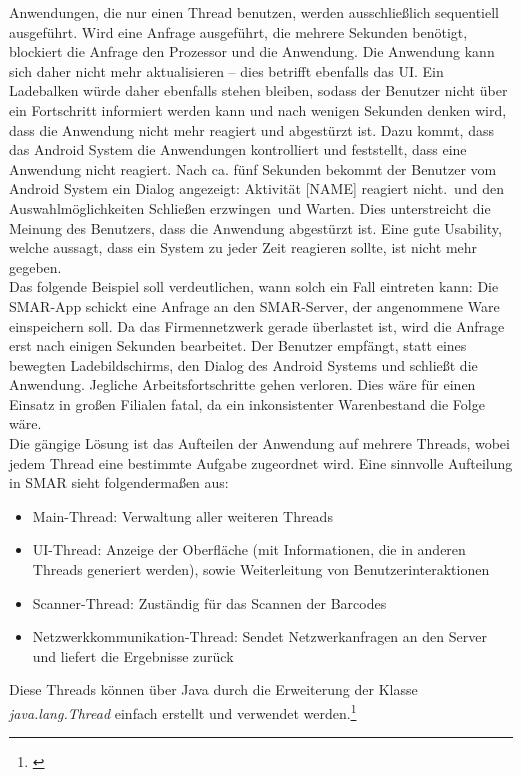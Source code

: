 Anwendungen, die nur einen Thread benutzen, werden ausschließlich sequentiell ausgeführt. Wird eine Anfrage ausgeführt, die mehrere Sekunden benötigt, blockiert die Anfrage den Prozessor und die Anwendung. Die Anwendung kann sich daher nicht mehr aktualisieren -- dies betrifft ebenfalls das \ac{UI}. Ein Ladebalken würde daher ebenfalls stehen bleiben, sodass der Benutzer nicht über ein Fortschritt informiert werden kann und nach wenigen Sekunden denken wird, dass die Anwendung nicht mehr reagiert und abgestürzt ist. Dazu kommt, dass das Android System die Anwendungen kontrolliert und feststellt, dass eine Anwendung nicht reagiert. Nach ca. fünf Sekunden bekommt der Benutzer vom Android System ein Dialog angezeigt: \glqq Aktivität [NAME] reagiert nicht.\grqq\ und den Auswahlmöglichkeiten \glqq Schließen erzwingen\grqq\ und \glqq Warten\grqq . Dies unterstreicht die Meinung des Benutzers, dass die Anwendung abgestürzt ist. Eine gute Usability, welche aussagt, dass ein System zu jeder Zeit reagieren sollte, ist nicht mehr gegeben.\\

Das folgende Beispiel soll verdeutlichen, wann solch ein Fall eintreten kann: Die \ac{SMAR}-App schickt eine Anfrage an den \ac{SMAR}-Server, der angenommene Ware einspeichern soll. Da das Firmennetzwerk gerade überlastet ist, wird die Anfrage erst nach einigen Sekunden bearbeitet. Der Benutzer empfängt, statt eines bewegten Ladebildschirms, den Dialog des Android Systems und schließt die Anwendung. Jegliche Arbeitsfortschritte gehen verloren. Dies wäre für einen Einsatz in großen Filialen fatal, da ein inkonsistenter Warenbestand die Folge wäre.\\

Die gängige Lösung ist das Aufteilen der Anwendung auf mehrere Threads, wobei jedem Thread eine bestimmte Aufgabe zugeordnet wird. Eine sinnvolle Aufteilung in \ac{SMAR} sieht folgendermaßen aus:
\begin{itemize}
	\item Main-Thread: Verwaltung aller weiteren Threads
	\item UI-Thread: Anzeige der Oberfläche (mit Informationen, die in anderen Threads generiert werden), sowie Weiterleitung von Benutzerinteraktionen
	\item Scanner-Thread: Zuständig für das Scannen der Barcodes
	\item Netzwerkkommunikation-Thread: Sendet Netzwerkanfragen an den Server und liefert die Ergebnisse zurück
\end{itemize}
Diese Threads können über Java durch die Erweiterung der Klasse \textit{java.lang.Thread} einfach erstellt und verwendet werden.\footnote{\citep[S. 18ff.]{java_threads}}\\

